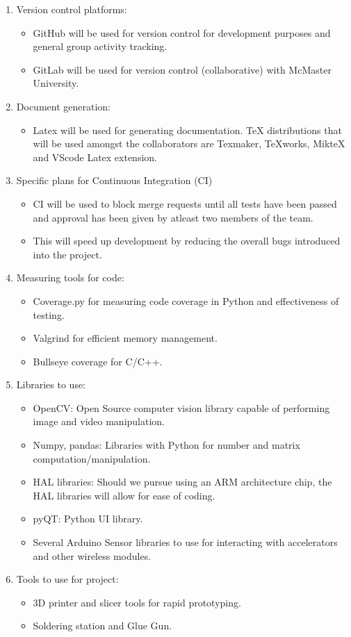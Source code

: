 \documentclass[12pt]{article}
\begin{document}
\begin{enumerate}
\item Version control platforms:
\begin{itemize}
\item GitHub will be used for version control for development purposes and general group activity tracking.
\item GitLab will be used for version control (collaborative) with McMaster University.
\end{itemize}
\item Document generation:
\begin{itemize}
\item Latex will be used for generating documentation. TeX distributions that will be used amongst the collaborators are  Texmaker, TeXworks, MikteX and VScode Latex extension.
\end{itemize}
\item Specific plans for Continuous Integration (CI)
\begin{itemize}
\item CI will be used to block merge requests until all tests have been passed and approval has been given by atleast two members of the team. 
\item This will speed up development by reducing the overall bugs introduced into the project.
\end{itemize}
\item Measuring tools for code:
\begin{itemize}
\item Coverage.py for measuring code coverage in Python and effectiveness of testing.
\item Valgrind for efficient memory management.
\item Bullseye coverage for C/C++.
\end{itemize}
\item Libraries to use:
\begin{itemize}
\item OpenCV: Open Source computer vision library capable of performing image and video manipulation.
\item Numpy, pandas: Libraries with Python for number and matrix computation/manipulation.
\item HAL libraries: Should we pursue using an ARM architecture chip, the HAL libraries will allow for ease of coding.
\item pyQT: Python UI library.
\item Several Arduino Sensor libraries to use for interacting with accelerators and other wireless modules.
\end{itemize}
\item Tools to use for project:
\begin{itemize}
\item 3D printer and slicer tools for rapid prototyping.
\item Soldering station and Glue Gun.
\end{itemize}
\end{enumerate}
\end{document}
